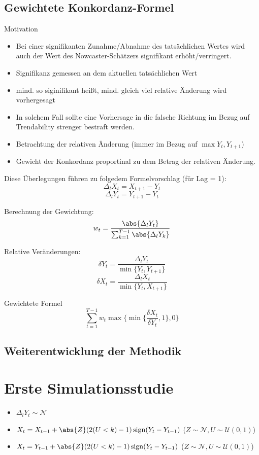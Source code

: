 \documentclass{article}
\theoremstyle{plain}%
\theoremstyle{definition}
\newcommand{\lag}[1][l]{\Delta_{#1}}
\DeclarePairedDelimiter{\abs}\lvert\rvert
\DeclareMathOperator{\sign}{sign}
\begin{document}
\subsection{Gewichtete Konkordanz-Formel}

Motivation

\begin{itemize}
    \item Bei einer signifikanten Zunahme/Abnahme des tatsächlichen Wertes wird auch der Wert des Nowcaster-Schätzers signifikant erhöht/verringert.
    \item Signifikanz gemessen an dem aktuellen tatsächlichen Wert
    \item mind. so siginifikant heißt, mind. gleich viel relative Änderung wird vorhergesagt
    \item In solchem Fall sollte eine Vorhersage in die falsche Richtung im Bezug auf Trendability strenger bestraft werden.
    \item Betrachtung der relativen Änderung (immer im Bezug auf $\max{Y_t, Y_{t+1}}$)
    \item Gewicht der Konkordanz proportinal zu dem Betrag der relativen Änderung.
\end{itemize}

Diese Überlegungen führen zu folgedem Formelvorschlag (für Lag = 1): 
\[\lag X_t = X_{t+1}-Y_{t}\]
\[\lag Y_t = Y_{t+1}-Y_{t}\]

Berechnung der Gewichtung: 
\[w_t=\frac{\abs{\lag Y_t}}{\sum_{k=1}^{T-1}\abs{\lag Y_k}}\]

Relative Veränderungen:
\[\delta Y_t = \frac{\lag Y_t}{\min\{Y_t, Y_{t+1}\}} \]
\[\delta X_t = \frac{\lag X_t}{\min\{Y_t, X_{t+1}\}} \]

Gewichtete Formel
\begin{equation}
  \sum_{t = 1}^{T - 1} w_t \max\{\min\{\frac{\delta X_t}{\delta Y_t},1\},0\}
\end{equation}

\subsection{Weiterentwicklung der Methodik}


\section{Erste Simulationsstudie}
\begin{itemize}
    \item $\lag Y_t \sim \mathcal{N}$
    \item $X_t = X_{t-1} + \abs{Z} (2 (U < k) - 1) \sign(Y_t - Y_{t-1})$ ($Z \sim \mathcal{N}, U \sim \mathcal{U}(0, 1)$) 
    \item $X_t = Y_{t-1} + \abs{Z} (2 (U < k) - 1) \sign(Y_t - Y_{t-1})$ ($Z \sim \mathcal{N}, U \sim \mathcal{U}(0, 1)$)
\end{itemize}
\end{document}
